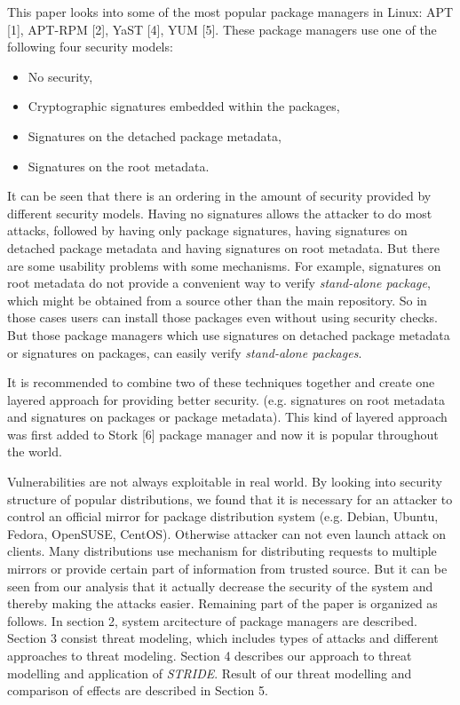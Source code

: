 \documentclass{IEEEtran}
\newcommand{\stride}{\emph{STRIDE}}
\begin{document}
This paper looks into some of the most popular package managers in Linux: APT [1], APT-RPM [2], YaST [4], YUM [5]. These package managers use one of the following four security models: 
\begin{itemize}
	\item No security,
	\item Cryptographic signatures embedded within the packages,
	\item Signatures on the detached package metadata, 
	\item Signatures on the root metadata.
\end{itemize} 
It can be seen that there is an ordering in the amount of security provided by different security models. Having no signatures allows the attacker to do most attacks, followed by having only package signatures, having signatures on detached package metadata and having signatures on root metadata. But there are some usability problems with some mechanisms. For example, signatures on root metadata do not provide a convenient way to verify \emph{stand-alone package}, which might be obtained from a source other than the main repository. So in those cases users can install those packages even without using security checks. But those package managers which use signatures on detached package metadata or signatures on packages, can easily verify \emph{stand-alone packages}.

It is recommended to combine two of these techniques together and create one layered approach for providing better security. (e.g. signatures on root metadata and signatures on packages or package metadata). This kind of layered approach was first added to Stork [6] package manager and now it is popular throughout the world.

Vulnerabilities are not always exploitable in real world. By looking into security structure of popular distributions, we found that it is necessary for an attacker to control an official mirror for package distribution system (e.g. Debian, Ubuntu, Fedora, OpenSUSE, CentOS). Otherwise attacker can not even launch attack on clients. Many distributions use mechanism for distributing requests to multiple mirrors or provide certain part of information from trusted source. But it can be seen from our analysis that it actually decrease the security of the system and thereby making the attacks easier. 
\newline Remaining part of the paper is organized as follows. In section 2, system arcitecture of package managers are described. Section 3 consist threat modeling, which includes types of attacks and different approaches to threat modeling. Section 4 describes our approach to threat modelling and application of \stride. Result of our threat modelling and comparison of effects are described in Section 5.
\end{document}
